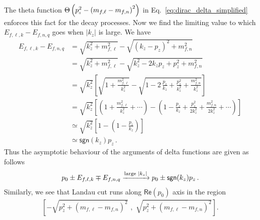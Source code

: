 \documentclass[aps,prd,floatfix,showpacs,showkeys,superscriptadress,unsortedaddress,nofootinbib,onecolumn]{revtex4-1}
\newcommand{\shp}{\shortparallel}
\newcommand{\nn}{\nonumber \\}
\begin{document}
The theta function $\Theta\left(p_{\shp}^2-\left(m_{f,\ell}-m_{f,n}\right)^2\right)$ in Eq.~\eqref{eq:dirac_delta_simplified} enforces this fact for the decay processes.
Now we find the limiting value to which $E_{f,\ell,k}-E_{f,n,q}$ goes when $|k_z|$ is large.  We have
\begin{align}
E_{f,\ell,k} - E_{f,n,q}&= \sqrt{k_z^2+m^2_{f,\ell}}-\sqrt{(k_z-p_z)^2+m^2_{f,n}} \nn
&=\sqrt{k_z^2+m^2_{f,\ell}} - \sqrt{k^2_z-2k_zp_z+p_z^2+m_{f,n}^2}\nn
&=\sqrt{k_z^2}\left[\sqrt{1+\frac{m^2_{f,\ell}}{k^2_z}}-\sqrt{1-2\,\frac{p_z}{k_z}+\frac{p^2_z}{k^2_z}+\frac{m^2_{f,n}}{k^2_z}}\right]\nn
&=\sqrt{k_z^2}\left[\left(1+\frac{m^2_{f,\ell}}{k^2_z}+\cdots\right)-\left(1-\frac{p_z}{k_z}+\frac{p^2_z}{2k^2_z}+\frac{m^2_{f,n}}{2k^2_z}+\cdots\right)\right]\nn
&\simeq\sqrt{k_z^2}\left[1-\left(1-\frac{p_z}{k_z}\right)\right] \nn
&\simeq \textsf{sgn}(k_z)p_z\,.
\end{align}
Thus the asymptotic behaviour of the arguments of delta functions are given as follows
\begin{align}
p_0\pm E_{f,\ell,k} \mp E_{f,n,q} \xrightarrow{\textmd{large  }|k_z|} p_0 \pm \textsf{sgn}(k_z)p_z\,.
\end{align} 
Similarly, we see that Landau cut runs along $\textsf{Re}(p_0)$ axis in the region  
\begin{align}
\left[-\sqrt{p^2_z+\left(m_{f,\ell}-m_{f,n}\right)^2}\,\,,\,\,\sqrt{p^2_z+\left(m_{f,\ell}-m_{f,n}\right)^2}\right].
\end{align} 
\end{document}

